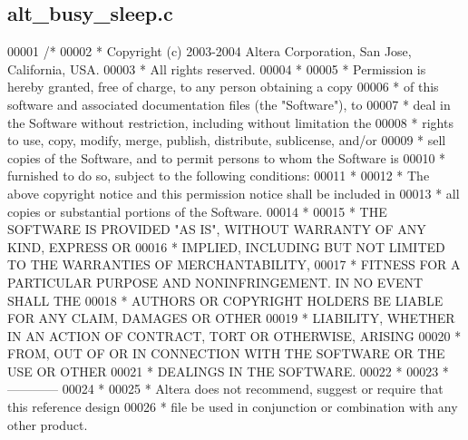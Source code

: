 \subsection{alt\+\_\+busy\+\_\+sleep.\+c}
\label{alt__busy__sleep_8c_source}

\begin{DoxyCode}
00001 \textcolor{comment}{/*}
00002 \textcolor{comment}{ * Copyright (c) 2003-2004 Altera Corporation, San Jose, California, USA.  }
00003 \textcolor{comment}{ * All rights reserved.}
00004 \textcolor{comment}{ * }
00005 \textcolor{comment}{ * Permission is hereby granted, free of charge, to any person obtaining a copy}
00006 \textcolor{comment}{ * of this software and associated documentation files (the "Software"), to }
00007 \textcolor{comment}{ * deal in the Software without restriction, including without limitation the }
00008 \textcolor{comment}{ * rights to use, copy, modify, merge, publish, distribute, sublicense, and/or}
00009 \textcolor{comment}{ * sell copies of the Software, and to permit persons to whom the Software is }
00010 \textcolor{comment}{ * furnished to do so, subject to the following conditions:}
00011 \textcolor{comment}{ *}
00012 \textcolor{comment}{ * The above copyright notice and this permission notice shall be included in }
00013 \textcolor{comment}{ * all copies or substantial portions of the Software.}
00014 \textcolor{comment}{ * }
00015 \textcolor{comment}{ * THE SOFTWARE IS PROVIDED "AS IS", WITHOUT WARRANTY OF ANY KIND, EXPRESS OR }
00016 \textcolor{comment}{ * IMPLIED, INCLUDING BUT NOT LIMITED TO THE WARRANTIES OF MERCHANTABILITY, }
00017 \textcolor{comment}{ * FITNESS FOR A PARTICULAR PURPOSE AND NONINFRINGEMENT. IN NO EVENT SHALL THE}
00018 \textcolor{comment}{ * AUTHORS OR COPYRIGHT HOLDERS BE LIABLE FOR ANY CLAIM, DAMAGES OR OTHER }
00019 \textcolor{comment}{ * LIABILITY, WHETHER IN AN ACTION OF CONTRACT, TORT OR OTHERWISE, ARISING }
00020 \textcolor{comment}{ * FROM, OUT OF OR IN CONNECTION WITH THE SOFTWARE OR THE USE OR OTHER }
00021 \textcolor{comment}{ * DEALINGS IN THE SOFTWARE.}
00022 \textcolor{comment}{ * }
00023 \textcolor{comment}{ * ------------}
00024 \textcolor{comment}{ *}
00025 \textcolor{comment}{ * Altera does not recommend, suggest or require that this reference design }
00026 \textcolor{comment}{ * file be used in conjunction or combination with any other product.}

\end{DoxyCode}
